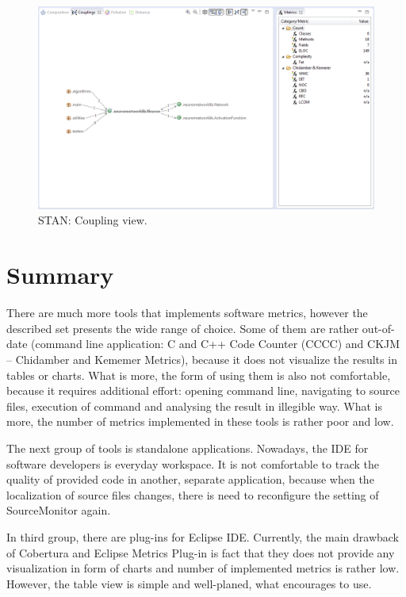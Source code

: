 \begin{figure}[h!]
	\centering
	\includegraphics[scale=0.45]{img/stan2.png} 
	\caption{STAN: Coupling view.}		
	\label{fig:stan2}
\end{figure}

\newpage

\section{Summary}

There are much more tools that implements software metrics, however the described set presents the wide range of choice. Some of them are rather out-of-date (command line application: C and C++ Code Counter (CCCC) and CKJM -- Chidamber and Kememer Metrics), because it does not visualize the results in tables or charts. What is more, the form of using them is also not comfortable, because it requires additional effort: opening command line, navigating to source files, execution of command and analysing the result in illegible way. What is more, the number of metrics implemented in these tools is rather poor and low.  

The next group of tools is standalone applications. Nowadays, the \ac{IDE} for software developers is everyday workspace. It is not comfortable to track the quality of provided code in another, separate application, because when the localization of source files changes, there is need to reconfigure the setting of SourceMonitor again. 

In third group, there are plug-ins for Eclipse \ac{IDE}. Currently, the main drawback of Cobertura and Eclipse Metrics Plug-in is fact that they does not provide any visualization in form of charts and number of implemented metrics is rather low. However, the table view is simple and well-planed, what encourages to use.

